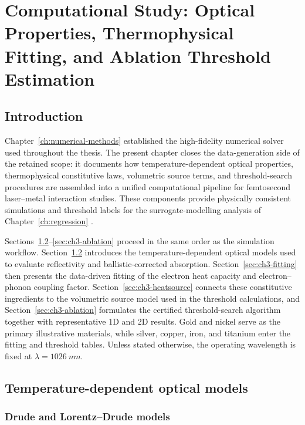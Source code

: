 \chapter{Computational Study: Optical Properties, Thermophysical Fitting,
  and Ablation Threshold Estimation}
\label{ch:computational-study}

\section{Introduction}
\label{sec:ch3-intro}

Chapter~\ref{ch:numerical-methods} established the high-fidelity
numerical solver used throughout the thesis. The present chapter closes
the data-generation side of the retained scope: it documents how
temperature-dependent optical properties, thermophysical constitutive
laws, volumetric source terms, and threshold-search procedures are
assembled into a unified computational pipeline for femtosecond
laser--metal interaction studies. These components provide physically
consistent simulations and threshold labels for the surrogate-modelling
analysis of Chapter~\ref{ch:regression} \cite{Song_2023,Forster_2021,He_2024}.

Sections~\ref{sec:ch3-optical}--\ref{sec:ch3-ablation} proceed in the
same order as the simulation workflow. Section~\ref{sec:ch3-optical}
introduces the temperature-dependent optical models used to evaluate
reflectivity and ballistic-corrected absorption. Section~\ref{sec:ch3-fitting}
then presents the data-driven fitting of the electron heat capacity and
electron--phonon coupling factor. Section~\ref{sec:ch3-heatsource}
connects these constitutive ingredients to the volumetric source model
used in the threshold calculations, and
Section~\ref{sec:ch3-ablation} formulates the certified threshold-search
algorithm together with representative 1D and 2D results. Gold and nickel
serve as the primary illustrative materials, while silver, copper, iron,
and titanium enter the fitting and threshold tables. Unless stated
otherwise, the operating wavelength is fixed at
\(\lambda = \SI{1026}{nm}\).

\section{Temperature-dependent optical models}
\label{sec:ch3-optical}

\subsection{Drude and Lorentz--Drude models}
\label{sec:ch3-optical-drude}

